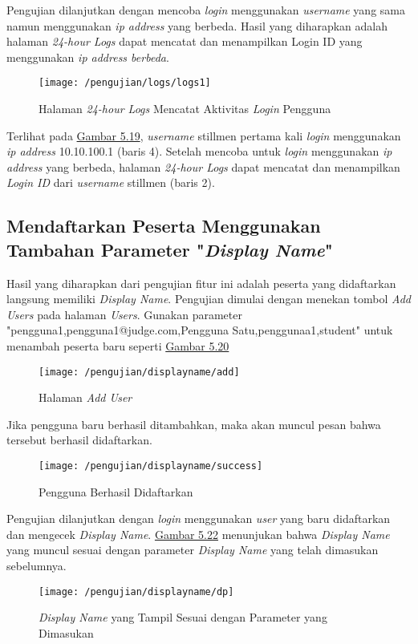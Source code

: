 	Pengujian dilanjutkan dengan mencoba \textit{login} menggunakan \textit{username} yang sama namun menggunakan \textit{ip address} yang berbeda. Hasil yang diharapkan adalah halaman \textit{24-hour Logs} dapat mencatat dan menampilkan Login ID yang menggunakan \textit{ip address berbeda}.
	\begin{figure}[H]
		\centering  
		\texttt{[image: /pengujian/logs/logs1]}  
		\caption[Halaman \textit{24-hour Logs} Mencatat Aktivitas \textit{Login} Pengguna]{Halaman \textit{24-hour Logs} Mencatat Aktivitas \textit{Login} Pengguna} 
		\label{fig:logs1} 
	\end{figure}
	Terlihat pada \hyperref[fig:logs1]{Gambar 5.19}, \textit{username} stillmen pertama kali \textit{login} menggunakan \textit{ip address} 10.10.100.1 (baris 4). Setelah mencoba untuk \textit{login} menggunakan \textit{ip address} yang berbeda, halaman \textit{24-hour Logs} dapat mencatat dan menampilkan \textit{Login ID} dari \textit{username} stillmen (baris 2).
	
	\subsection{Mendaftarkan Peserta Menggunakan Tambahan Parameter "\textit{Display Name}"}
	Hasil yang diharapkan dari pengujian fitur ini adalah peserta yang didaftarkan langsung memiliki \textit{Display Name}. Pengujian dimulai dengan menekan tombol \textit{Add Users} pada halaman \textit{Users}. Gunakan parameter "pengguna1,pengguna1@judge.com,Pengguna Satu,penggunaa1,student" untuk menambah peserta baru seperti \hyperref[fig:useradd]{Gambar 5.20}
	\begin{figure}[H]
		\centering  
		\texttt{[image: /pengujian/displayname/add]}  
		\caption[Halaman \textit{Add User}]{Halaman \textit{Add User}} 
		\label{fig:useradd} 
	\end{figure}

	Jika pengguna baru berhasil ditambahkan, maka akan muncul pesan bahwa tersebut berhasil didaftarkan.
	\begin{figure}[H]
		\centering  
		\texttt{[image: /pengujian/displayname/success]}  
		\caption[Pengguna Berhasil Didaftarkan]{Pengguna Berhasil Didaftarkan} 
		\label{fig:success} 
	\end{figure}

	Pengujian dilanjutkan dengan \textit{login} menggunakan \textit{user} yang baru didaftarkan dan mengecek \textit{Display Name}. \hyperref[fig:dp]{Gambar 5.22} menunjukan bahwa \textit{Display Name} yang muncul sesuai dengan parameter \textit{Display Name} yang telah dimasukan sebelumnya.
	\begin{figure}[H]
		\centering  
		\texttt{[image: /pengujian/displayname/dp]}  
		\caption[\textit{Display Name} yang Tampil Sesuai dengan Parameter yang Dimasukan]{\textit{Display Name} yang Tampil Sesuai dengan Parameter yang Dimasukan} 
		\label{fig:dp} 
	\end{figure}

